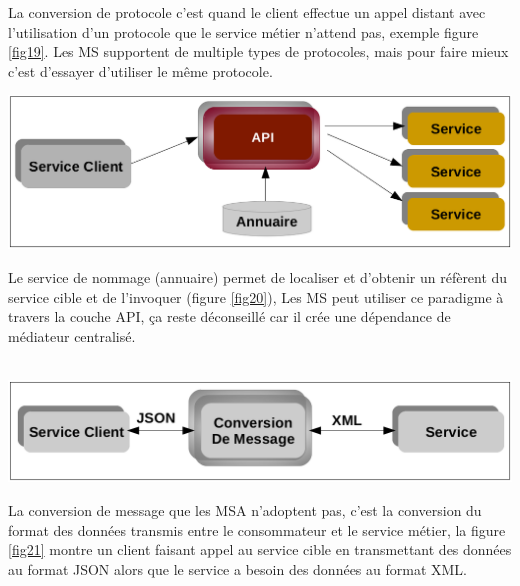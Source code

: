 \documentclass[12pt, a4paper, openany]{report}
\begin{document}
    La conversion de protocole c'est quand le client effectue un  appel distant avec l'utilisation d'un protocole que le service métier n'attend pas, exemple figure \ref{fig19}. Les MS supportent de multiple types de protocoles,  mais pour faire mieux c'est d'essayer d'utiliser le même protocole. \\
    
    \begin{center}
      \includegraphics[scale=0.3]{annuaire_20.png}
      \label{fig20}
    \end{center}
    
    Le service de nommage (annuaire) permet de localiser et d'obtenir un réfèrent du service cible et de l'invoquer (figure \ref{fig20}), Les MS peut utiliser ce paradigme à travers la couche API, ça reste déconseillé car il crée une dépendance de médiateur centralisé.  \\ \\
    
    \begin{center}
      \includegraphics[scale=0.3]{convers_msg_21.png}
      \label{fig21}
    \end{center}   
    
    La conversion de message que les MSA n'adoptent pas, c'est la conversion du format des données transmis entre le consommateur et le service métier, la figure \ref{fig21} montre un client faisant appel au service cible en transmettant des données au format JSON alors que le service a besoin des données au format XML.\\
    
   
\end{document}
